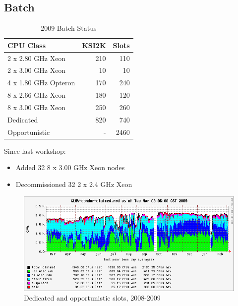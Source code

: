 \documentclass{beamer}
\begin{document}
\subsection{Batch}
\begin{frame}
\begin{table}
\begin{tabular}{lrr}
    \toprule
    CPU Class               &   KSI2K   &   Slots \\
    \midrule
    2 x 2.80 GHz Xeon       &   210     &   110 \\  %
    2 x 3.00 GHz Xeon       &   10      &   10 \\   %
    4 x 1.80 GHz Opteron    &   170     &   240 \\  %
    8 x 2.66 GHz Xeon       &   180     &   120 \\  %
    8 x 3.00 GHz Xeon       &   250     &   260 \\  %
    \midrule
    Dedicated               &   820     &   740 \\
    Opportunistic           &   -       &   2460 \\
    \bottomrule
\end{tabular}
\caption{2009 Batch Status}
\label{2009_batch_status}
\end{table}

Since last workshop:
\begin{itemize}
    \item Added 32 8 x 3.00 GHz Xeon nodes
    \item Decommissioned 32 2 x 2.4 GHz Xeon
\end{itemize}
\end{frame}

\begin{frame}
\begin{figure}
    \includegraphics[width=\textwidth]{Graphics/GLOW-condor-claimed-1yr.png}
    \caption{Dedicated and opportunistic slots, 2008-2009}
\end{figure}
\end{frame}
\end{document}
